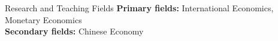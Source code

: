 \documentclass{resume_liang} %
\begin{document}

\begin{rSection}{Research and Teaching Fields}
{\bf Primary fields:} International Economics, Monetary Economics \\ 
{\bf Secondary fields:} Chinese Economy  \\
\end{rSection}
\bigskip \bigskip






\end{document}
